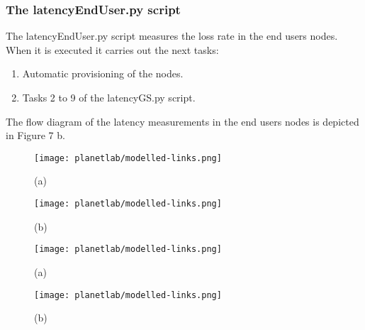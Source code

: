 \subsubsection{The latencyEndUser.py script}

The latencyEndUser.py  script measures the loss rate in the end users
nodes. When it is executed it carries out the next tasks:
\begin{enumerate}
\item Automatic provisioning of the nodes.
\item Tasks 2 to 9 of the latencyGS.py script.
\end{enumerate}

The flow diagram of the latency measurements in the end users nodes is depicted
in Figure 7 b.

\begin{multicols}{2}
\begin{figure}[!h]
\begin{center}
\texttt{[image: planetlab/modelled-links.png]}
\caption{(a)}
\label{fig:ple-workflow-bandwidth}
\end{center}
\end{figure}
\columnbreak
\begin{figure}[!h]
\begin{center}
\texttt{[image: planetlab/modelled-links.png]}
\caption{(b)}
\label{fig:ple-workflow-loss-rate}
\end{center}
\end{figure}
\end{multicols}

\begin{multicols}{2}
\begin{figure}[!h]
\begin{center}
\texttt{[image: planetlab/modelled-links.png]}
\caption{(a)}
\label{fig:ple-workflow-latency-user}
\end{center}
\end{figure}
\columnbreak
\begin{figure}[!h]
\begin{center}
\texttt{[image: planetlab/modelled-links.png]}
\caption{(b)}
\label{fig:ple-workflow-latency-gs}
\end{center}
\end{figure}
\end{multicols}


